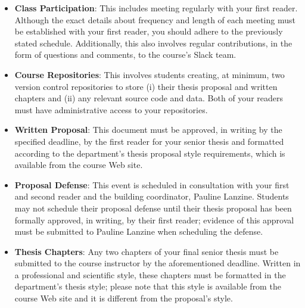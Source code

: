\begin{itemize}
  \itemsep -.25em

  \item {\bf Class Participation}: This includes meeting regularly with your first reader. Although the exact details
    about frequency and length of each meeting must be established with your first reader, you should adhere to the
    previously stated schedule. Additionally, this also involves regular contributions, in the form of questions and
    comments, to the course's Slack team.

  \item {\bf Course Repositories}: This involves students creating, at minimum, two version control repositories to
    store (i) their thesis proposal and written chapters and (ii) any relevant source code and data.  Both of your
    readers must have administrative access to your repositories.


  \item {\bf Written Proposal}: This document must be approved, in writing by the specified deadline, by the first
    reader for your senior thesis and formatted according to the department's thesis proposal style requirements,
    which is available from the course Web site.

  \item {\bf Proposal Defense}: This event is scheduled in consultation with your first and second reader and the
    building coordinator, Pauline Lanzine. Students may not schedule their proposal defense until their thesis proposal
    has been formally approved, in writing, by their first reader; evidence of this approval must be submitted to
    Pauline Lanzine when scheduling the defense.

  \item {\bf Thesis Chapters}: Any two chapters of your final senior thesis must be submitted to the course instructor
    by the aforementioned deadline.  Written in a professional and scientific style, these chapters must be formatted in
    the department's thesis style; please note that this style is available from the course Web site and it is different
    from the proposal's style.

\end{itemize}


